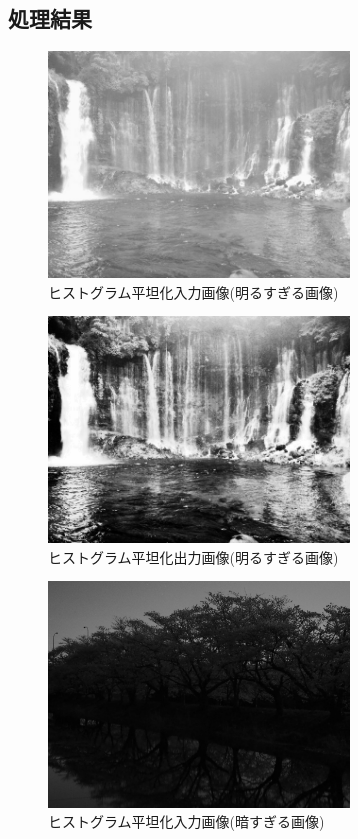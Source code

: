 \documentclass[11pt,a4j]{jsarticle}
\begin{document}
    \subsection{処理結果}
    \begin{figure}[H]
      \centering
      \includegraphics[clip,width=8.0cm ,height= 6.0cm]{./img/histgram/his_bright_source.png}
      \caption{ヒストグラム平坦化入力画像(明るすぎる画像)\label{fig:his_bright_source}}
    \end{figure}
    \begin{figure}[H]
      \centering
      \includegraphics[clip,width=8.0cm ,height= 6.0cm]{./img/histgram/his_bright.png}
      \caption{ヒストグラム平坦化出力画像(明るすぎる画像)\label{fig:his_bright_result}}
    \end{figure}
    \begin{figure}[H]
      \centering
      \includegraphics[clip,width=8.0cm ,height= 6.0cm]{./img/histgram/his_dark_source.png}
      \caption{ヒストグラム平坦化入力画像(暗すぎる画像)\label{fig:his_dark_source}}
    \end{figure}
\end{document}
